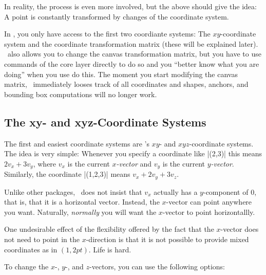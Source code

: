 In reality, the process is even more involved, but the above should
give the idea: A point is constantly transformed by changes of the
coordinate system.

In \tikzname, you only have access to the first two coordiante systems:
The $xy$-coordinate system and the coordinate transformation matrix
(these will be explained later). \pgfname\ also allows you to change
the canvas transformation matrix, but you have to use commands of
the core layer directly to do so and you ``better know what you are
doing'' when you use do this. The moment you start modifying the
canvas matrix, \pgfname\ immediately looses track of all
coordinates and shapes, anchors, and bounding box computations will no
longer work.


\subsection{The xy- and xyz-Coordinate Systems}

The first and easiest coordinate systems are \pgfname's $xy$- and
$xyz$-coordinate systems. The idea is very simple: Whenever you
specify a coordinate like |(2,3)| this means $2v_x + 3v_y$, where
$v_x$ is the current \emph{$x$-vector} and $v_y$ is the current
\emph{$y$-vector}. Similarly, the coordinate |(1,2,3)| means $v_x +
2v_y + 3v_z$.

Unlike other packages, \pgfname\ does not insist that $v_x$ actually
has a $y$-component of $0$, that is, that it is a horizontal
vector. Instead, the $x$-vector can point anywhere you
want. Naturally, \emph{normally} you will want the $x$-vector to point
horizontallly.

One undesirable effect of the flexibility offered by the fact that the
$x$-vector does not need to point in the $x$-direction is that it is
not possible to provide mixed coordinates as in $(1,2pt)$. Life is
hard.

To change the $x$-, $y$-, and $z$-vectors, you can use the following
options:


